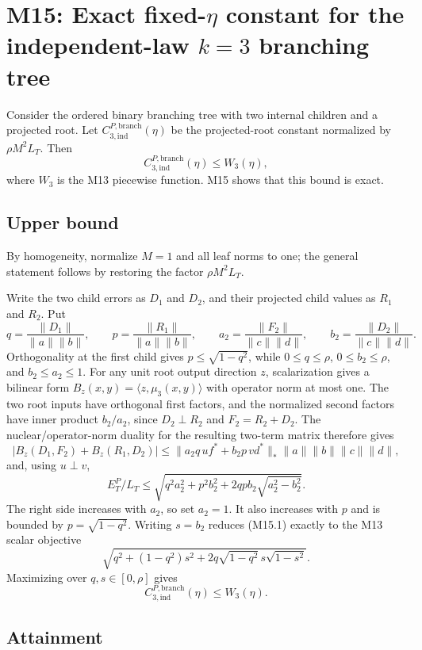 \section*{M15: Exact fixed-$\eta$ constant for the independent-law $k=3$ branching tree}
\label{sec:m15-exact-branching}

Consider the ordered binary branching tree with two internal children and a
projected root. Let $C_{3,\mathrm{ind}}^{P,\mathrm{branch}}(\eta)$ be the
projected-root constant normalized by $\rho M^2L_T$. Then
\[
 C_{3,\mathrm{ind}}^{P,\mathrm{branch}}(\eta)\le W_3(\eta),
\]
where $W_3$ is the M13 piecewise function. M15 shows that this bound is exact.

\subsection*{Upper bound}

By homogeneity, normalize $M=1$ and all leaf norms to one; the general
statement follows by restoring the factor $\rho M^2L_T$.

Write the two child errors as $D_1$ and $D_2$, and their projected child
values as $R_1$ and $R_2$. Put
\[
 q=\frac{\|D_1\|}{\|a\|\|b\|},\qquad
 p=\frac{\|R_1\|}{\|a\|\|b\|},\qquad
 a_2=\frac{\|F_2\|}{\|c\|\|d\|},\qquad
 b_2=\frac{\|D_2\|}{\|c\|\|d\|}.
\]
Orthogonality at the first child gives $p\le\sqrt{1-q^2}$, while
$0\le q\le\rho$, $0\le b_2\le\rho$, and $b_2\le a_2\le1$. For any unit
root output direction $z$, scalarization gives a bilinear form
$B_z(x,y)=\langle z,\mu_3(x,y)\rangle$ with operator norm at most one.
The two root inputs have orthogonal first factors, and the normalized second
factors have inner product $b_2/a_2$, since $D_2\perp R_2$ and
$F_2=R_2+D_2$. The nuclear/operator-norm duality for the resulting two-term
matrix therefore gives
\[
 |B_z(D_1,F_2)+B_z(R_1,D_2)|
 \le \|a_2q\,u f^*+b_2p\,v d^*\|_*
 \|a\|\|b\|\|c\|\|d\|,
\]
and, using $u\perp v$,
\[
 E_T^P/L_T
 \le \sqrt{q^2a_2^2+p^2b_2^2
       +2qpb_2\sqrt{a_2^2-b_2^2}}.
\tag{M15.1}
\]
The right side increases with $a_2$, so set $a_2=1$. It also increases with
$p$ and is bounded by $p=\sqrt{1-q^2}$. Writing $s=b_2$ reduces
(M15.1) exactly to the M13 scalar objective
\[
 \sqrt{q^2+(1-q^2)s^2
       +2q\sqrt{1-q^2}\,s\sqrt{1-s^2}}.
\]
Maximizing over $q,s\in[0,\rho]$ gives
\[
 C_{3,\mathrm{ind}}^{P,\mathrm{branch}}(\eta)\le W_3(\eta).
\tag{M15.2}
\]

\subsection*{Attainment}

